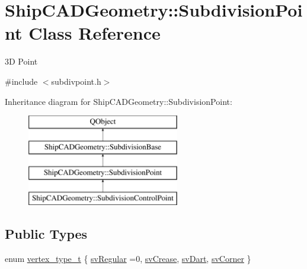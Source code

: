 \hypertarget{classShipCADGeometry_1_1SubdivisionPoint}{\section{Ship\-C\-A\-D\-Geometry\-:\-:Subdivision\-Point Class Reference}
\label{classShipCADGeometry_1_1SubdivisionPoint}
}


3\-D Point  




{\ttfamily \#include $<$subdivpoint.\-h$>$}

Inheritance diagram for Ship\-C\-A\-D\-Geometry\-:\-:Subdivision\-Point\-:\begin{figure}[H]
\begin{center}
\leavevmode
\includegraphics[height=4.000000cm]{classShipCADGeometry_1_1SubdivisionPoint}
\end{center}
\end{figure}
\subsection*{Public Types}
\begin{DoxyCompactItemize}
\item 
enum \hyperlink{classShipCADGeometry_1_1SubdivisionPoint_a03df9289cd8543cd3a567fa6c8e44c43}{vertex\-\_\-type\-\_\-t} \{ \hyperlink{classShipCADGeometry_1_1SubdivisionPoint_a03df9289cd8543cd3a567fa6c8e44c43a30dab596d2a968d283f161c490768ab0}{sv\-Regular} =0, 
\hyperlink{classShipCADGeometry_1_1SubdivisionPoint_a03df9289cd8543cd3a567fa6c8e44c43a7724ab9a0642a0ad21a896fb61a38035}{sv\-Crease}, 
\hyperlink{classShipCADGeometry_1_1SubdivisionPoint_a03df9289cd8543cd3a567fa6c8e44c43a94b87414422f77b76ecdbfadf29b985c}{sv\-Dart}, 
\hyperlink{classShipCADGeometry_1_1SubdivisionPoint_a03df9289cd8543cd3a567fa6c8e44c43adaf8032ead1bd79e03cff882b7b3987f}{sv\-Corner}
 \}
\end{DoxyCompactItemize}

